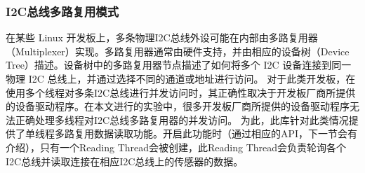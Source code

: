 \subsubsection{I2C总线多路复用模式}
在某些 Linux 开发板上，多条物理I2C总线外设可能在内部由多路复用器（Multiplexer）实现。多路复用器通常由硬件支持，并由相应的设备树（Device Tree）描述。设备树中的多路复用器节点描述了如何将多个 I2C 设备连接到同一物理 I2C 总线上，并通过选择不同的通道或地址进行访问。
对于此类开发板，在使用多个线程对多条I2C总线进行并发访问时，其正确性取决于开发板厂商所提供的设备驱动程序。在本文进行的实验中，很多开发板厂商所提供的设备驱动程序无法正确处理多线程对I2C总线多路复用器的并发访问。
为此，此库针对此类情况提供了单线程多路复用数据读取功能。开启此功能时（通过相应的API，下一节会有介绍），只有一个Reading Thread会被创建，此Reading Thread会负责轮询各个I2C总线并读取连接在相应I2C总线上的传感器的数据。

